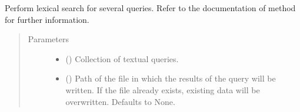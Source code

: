 \documentclass[letterpaper,10pt,english]{sphinxmanual}
\begin{document}
\begin{fulllineitems}
\begin{fulllineitems}
\label{\detokenize{code:lexical_search.TfIdfSearch.search_multiple}}
Perform lexical search for several queries. Refer to the documentation
of  method for further information.
\begin{quote}\begin{description}
\item[{Parameters}] \leavevmode\begin{itemize}
\item {} 
 () \textendash{} Collection of textual queries.

\item {} 
 (\sphinxstyleliteralemphasis{\sphinxupquote{, }}) \textendash{} Path of the file in which the results of the query will be
written. If the file already exists, existing data will be overwritten.
Defaults to None.

\end{itemize}

\end{description}\end{quote}

\end{fulllineitems}



\end{fulllineitems}
\end{document}
